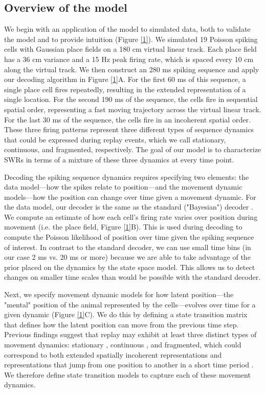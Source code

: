 \documentclass[times, twoside]{zHenriquesLab-StyleBioRxiv}
\begin{document}
\subsection*{Overview of the model}
We begin with an application of the model to simulated data, both to validate the model and to provide intuition (Figure \ref{1}). We simulated 19 Poisson spiking cells with Gaussian place fields on a 180 cm virtual linear track. Each place field has a 36 cm variance and a 15 Hz peak firing rate, which is spaced every 10 cm along the virtual track. We then construct an 280 ms spiking sequence and apply our decoding algorithm in Figure \ref{1}A. For the first 60 ms of this sequence, a single place cell fires repeatedly, resulting in the extended representation of a single location. For the second 190 ms of the sequence, the cells fire in sequential spatial order, representing a fast moving trajectory across the virtual linear track. For the last 30 ms of the sequence, the cells fire in an incoherent spatial order. These three firing patterns represent three different types of sequence dynamics that could be expressed during replay events, which we call stationary, continuous, and fragmented, respectively. The goal of our model is to characterize SWRs in terms of a mixture of these three dynamics at every time point.

Decoding the spiking sequence dynamics requires specifying two elements: the data model---how the spikes relate to position---and the movement dynamic models---how the position can change over time given a movement dynamic. For the data model, our decoder is the same as the standard ("Bayesian") decoder \cite{DavidsonHippocampalReplayExtended2009, PfeifferAutoassociativedynamicsgeneration2015, StellaHippocampalReactivationRandom2019}. We compute an estimate of how each cell's firing rate varies over position during movement (i.e. the place field, Figure \ref{1}B). This is used during decoding to compute the Poisson likelihood of position over time given the spiking sequence of interest. In contrast to the standard decoder, we can use small time bins (in our case 2 ms vs. 20 ms or more) because we are able to take advantage of the prior placed on the dynamics by the state space model. This allows us to detect changes on smaller time scales than would be possible with the standard decoder.

Next, we specify movement dynamic models for how latent position---the "mental" position of the animal represented by the cells---evolves over time for a given dynamic (Figure \ref{1}C). We do this by defining a state transition matrix that defines how the latent position can move from the previous time step. Previous findings suggest that replay may exhibit at least three distinct types of movement dynamics: stationary \cite{JaiDistincthippocampalcorticalmemory2017, FarooqEmergencepreconfiguredplastic2019}, continuous \cite{DavidsonHippocampalReplayExtended2009}, and fragmented, which could correspond to both extended spatially incoherent representations and representations that jump from one position to another in a short time period \cite{PfeifferAutoassociativedynamicsgeneration2015}. We therefore define state transition models to capture each of these movement dynamics.
\end{document}
